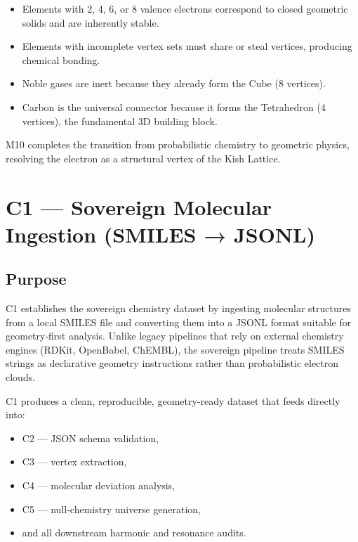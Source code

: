 \documentclass[11pt, letterpaper, openany]{book}
\begin{document}
\begin{itemize}
    \item Elements with 2, 4, 6, or 8 valence electrons correspond to closed
          geometric solids and are inherently stable.
    \item Elements with incomplete vertex sets must share or steal vertices,
          producing chemical bonding.
    \item Noble gases are inert because they already form the Cube (8 vertices).
    \item Carbon is the universal connector because it forms the Tetrahedron (4 vertices),
          the fundamental 3D building block.
\end{itemize}

M10 completes the transition from probabilistic chemistry to geometric physics,
resolving the electron as a structural vertex of the Kish Lattice.



\section{C1 — Sovereign Molecular Ingestion (SMILES → JSONL)}

\subsection*{Purpose}
C1 establishes the sovereign chemistry dataset by ingesting molecular structures
from a local SMILES file and converting them into a JSONL format suitable for
geometry‑first analysis. Unlike legacy pipelines that rely on external chemistry
engines (RDKit, OpenBabel, ChEMBL), the sovereign pipeline treats SMILES strings
as declarative geometry instructions rather than probabilistic electron clouds.

C1 produces a clean, reproducible, geometry‑ready dataset that feeds directly into:

\begin{itemize}
    \item C2 — JSON schema validation,
    \item C3 — vertex extraction,
    \item C4 — molecular deviation analysis,
    \item C5 — null‑chemistry universe generation,
    \item and all downstream harmonic and resonance audits.
\end{itemize}
\end{document}
